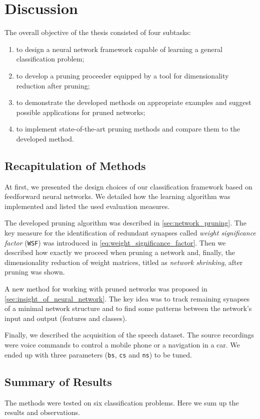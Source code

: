\chapter{Discussion} \label{chap:discussion}
The overall objective of the thesis consisted of four subtasks:

\begin{enumerate}
\item to design a neural network framework capable of learning a general classification problem;
\item to develop a pruning proceeder equipped by a tool for dimensionality reduction after pruning;
\item to demonstrate the developed methods on appropriate examples and suggest possible applications for pruned networks;
\item to implement state-of-the-art pruning methods and compare them to the developed method.
\end{enumerate}

\section{Recapitulation of Methods} \label{sec:recapitulation_of_methods}
At first, we presented the design choices of our classification framework based on feedforward neural networks. We detailed how the learning algorithm was implemented and listed the used evaluation measures.

The developed pruning algorithm was described in \cref{sec:network_pruning}. The key measure for the identification of redundant synapses called \textit{weight significance factor} (\texttt{WSF}) was introduced in \cref{eq:weight_significance_factor}. Then we described how exactly we proceed when pruning a network and, finally, the dimensionality reduction of weight matrices, titled as \textit{network shrinking}, after pruning was shown.

A new method for working with pruned networks was proposed in \cref{sec:insight_of_neural_network}. The key idea was to track remaining synapses of a minimal network structure and to find some patterns between the network's input and output (features and classes).

Finally, we described the acquisition of the speech dataset. The source recordings were voice commands to control a mobile phone or a navigation in a car. We ended up with three parameters (\texttt{bs}, \texttt{cs} and \texttt{ns}) to be tuned.

\section{Summary of Results} \label{sec:summary_of_results}
The methods were tested on six classification problems. Here we sum up the results and observations.

